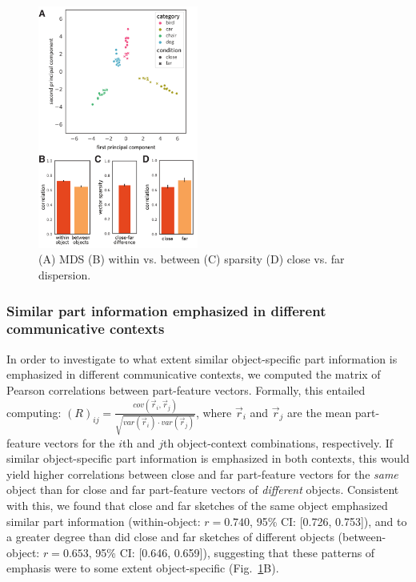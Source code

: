 \documentclass[10pt,letterpaper]{article}
\begin{document}
\begin{figure}[htbp]
\centering
\includegraphics[width=0.47\textwidth]{figures/7_part_emphasis.pdf}
\caption{(A) MDS (B) within vs. between (C) sparsity (D) close vs. far dispersion.}
\label{part_emphasis}
\end{figure}



\subsubsection{Similar part information emphasized in different communicative contexts}

In order to investigate to what extent similar object-specific part information is emphasized in different communicative contexts, we computed the matrix of Pearson correlations between part-feature vectors. 
Formally, this entailed computing: $(R)_{ij} =  \frac{cov(\vec{r}_{i}, \vec{r}_{j})}{\sqrt{var(\vec{r}_{i}) \cdot var(\vec{r}_{j})}}$, where $\vec{r}_{i}$ and $\vec{r}_{j}$ are the mean part-feature vectors for the $i$th and $j$th object-context combinations, respectively.
If similar object-specific part information is emphasized in both contexts, this would yield higher correlations between close and far part-feature vectors for the \textit{same} object than for close and far part-feature vectors of \textit{different} objects. 
Consistent with this, we found that close and far sketches of the same object emphasized similar part information (within-object: $r = 0.740$, 95\% CI: [0.726, 0.753]), and to a greater degree than did close and far sketches of different objects (between-object: $r = 0.653$, 95\% CI: [0.646, 0.659]), suggesting that these patterns of emphasis were to some extent object-specific (Fig.~\ref{part_emphasis}B). 
\end{document}
